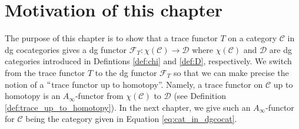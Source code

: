 \section{Motivation of this chapter}
The purpose of this chapter is to 
show that a trace functor $T$ on a 
category $\mathcal{C}$ in dg cocategories 
gives a dg functor $\mathcal{F}_T: 
\chi(\mathcal{C}) \to \mathcal{D}$ where 
$\chi(\mathcal{C})$ and 
$\mathcal{D}$ are dg categories 
introduced in Defintions \ref{def:chi} and 
\ref{def:D}, respectively. We switch from 
the trace functor $T$ to the dg functor 
$\mathcal{F}_T$ so that we can make 
precise the notion of a $``$trace 
functor up to homotopy''. Namely, a 
trace functor on $\mathcal{C}$ up to homotopy 
is an $A_\infty$-functor from 
$\chi(\mathcal{C})$ to $\mathcal{D}$ 
(see Definition \ref{def:trace_up_to_homotopy}). 
In the next chapter, we give such an $A_\infty$-functor 
for $\mathcal{C}$ being the category 
given in Equation \ref{eq:cat_in_dgcocat}.